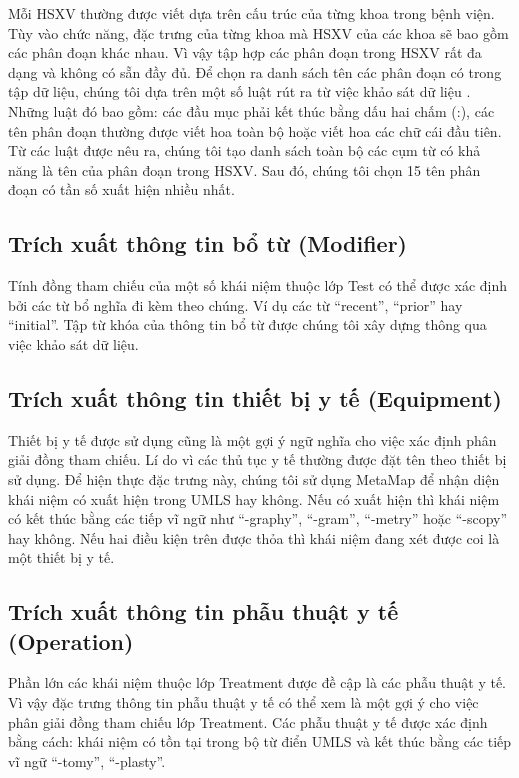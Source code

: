 Mỗi HSXV thường được viết dựa trên cấu trúc của từng khoa trong bệnh viện. Tùy vào chức năng, đặc trưng của từng khoa mà HSXV của các khoa sẽ bao gồm các phân đoạn khác nhau. Vì vậy tập hợp các phân đoạn trong HSXV rất đa dạng và không có sẵn đầy đủ. Để chọn ra danh sách tên các phân đoạn có trong tập dữ liệu, chúng tôi dựa trên một số luật rút ra từ việc khảo sát dữ liệu \cite{RandolphMiller2008}. Những luật đó bao gồm: các đầu mục phải kết thúc bằng dấu hai chấm (:), các tên phân đoạn thường được viết hoa toàn bộ hoặc viết hoa các chữ cái đầu tiên. Từ các luật được nêu ra, chúng tôi tạo danh sách toàn bộ các cụm từ có khả năng là tên của phân đoạn trong HSXV. Sau đó, chúng tôi chọn 15 tên phân đoạn có tần số xuất hiện nhiều nhất.

\subsection*{Trích xuất thông tin bổ từ (Modifier)}
Tính đồng tham chiếu của một số khái niệm thuộc lớp Test có thể được xác định bởi các từ bổ nghĩa đi kèm theo chúng. Ví dụ các từ “recent”, “prior” hay “initial”. Tập từ khóa của thông tin bổ từ được chúng tôi xây dựng thông qua việc khảo sát dữ liệu.

\subsection*{Trích xuất thông tin thiết bị y tế (Equipment)}
Thiết bị y tế được sử dụng cũng là một gợi ý ngữ nghĩa cho việc xác định phân giải đồng tham chiếu. Lí do vì các thủ tục y tế thường được đặt tên theo thiết bị sử dụng. Để hiện thực đặc trưng này, chúng tôi sử dụng MetaMap để nhận diện khái niệm có xuất hiện trong UMLS hay không. Nếu có xuất hiện thì khái niệm có kết thúc bằng các tiếp vĩ ngữ như ``-graphy'', ``-gram'', ``-metry'' hoặc ``-scopy'' hay không. Nếu hai điều kiện trên được thỏa thì khái niệm đang xét được coi là một thiết bị y tế.

\subsection*{Trích xuất thông tin phẫu thuật y tế (Operation)}
Phần lớn các khái niệm thuộc lớp Treatment được đề cập là các phẫu thuật y tế. Vì vậy đặc trưng thông tin phẫu thuật y tế có thể xem là một gợi ý cho việc phân giải đồng tham chiếu lớp Treatment. Các phẫu thuật y tế được xác định bằng cách: khái niệm có tồn tại trong bộ từ điển UMLS và kết thúc bằng các tiếp vĩ ngữ ``-tomy'', ``-plasty''.

